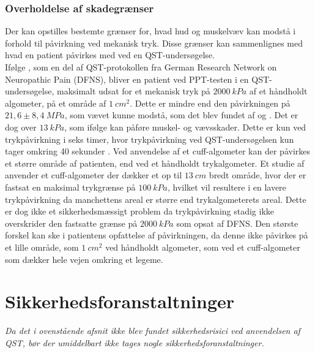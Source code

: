 \subsubsection{Overholdelse af skadegrænser}
Der kan opstilles bestemte grænser for, hvad hud og muskelvæv kan modstå i forhold til påvirkning ved mekanisk tryk. Disse grænser kan sammenlignes med hvad en patient påvirkes med ved en QST-undersøgelse. \\
Ifølge , som en del af QST-protokollen fra German Research Network on Neuropathic Pain (DFNS), bliver en patient ved PPT-testen i en QST-undersøgelse, maksimalt udsat for et mekanisk tryk på $2000~kPa$ af et håndholdt algometer, på et område af $1~cm^{2}$. Dette er mindre end den påvirkningen på $21,6 \pm 8,4~MPa$, som vævet kunne modstå, som det blev fundet af  og . Det er dog over $13~kPa$, som ifølge  kan påføre muskel- og vævsskader. Dette er kun ved trykpåvirkning i seks timer, hvor trykpåvirkning ved QST-undersøgelsen kun tager omkring 40 sekunder \cite{Rolke2006b}. Ved anvendelse af et cuff-algometer kan der påvirkes et større område af patienten, end ved et håndholdt trykalgometer. Et studie af  anvender et cuff-algometer der dækker et op til $13~cm$ bredt område, hvor der er fastsat en maksimal trykgrænse på $100~kPa$, hvilket vil resultere i en lavere trykpåvirkning da manchettens areal er større end trykalgometerets areal. Dette er dog ikke et sikkerhedsmæssigt problem da trykpåvirkning stadig ikke overskrider den fastsatte grænse på $2000~kPa$ som opsat af DFNS. Den største forskel kan ske i patientens opfattelse af påvirkningen, da denne ikke påvirkes på et lille område, som $1~cm^{2}$ ved håndholdt algometer, som ved et cuff-algometer som dækker hele vejen omkring et legeme. %

\section{Sikkerhedsforanstaltninger}
\textit{Da det i ovenstående afsnit ikke blev fundet sikkerhedsrisici ved anvendelsen af QST, bør der umiddelbart ikke tages nogle sikkerhedsforanstaltninger.} 


